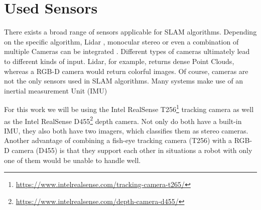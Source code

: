 \documentclass[main.tex]{subfiles}
\begin{document}
\section{Used Sensors}
There exists a broad range of sensors applicable for SLAM algorithms. Depending on the specific algorithm, Lidar \cite{8461000}, monocular \cite{Artal_Montiel_Tardos_2015} stereo \cite{Usenko_Engel_Stuckler_Cremers_2016} or even a combination of multiple Cameras can be integrated \cite{Harmat_Sharf_Trentini_2012}.
Different types of cameras ultimately lead to different kinds of input. Lidar, for example, returns dense Point Clouds, whereas a RGB-D camera would return colorful images.
Of course, cameras are not the only sensors used in SLAM algorithms. Many systems make use of an inertial measurement Unit (IMU) \cite{Leutenegger_Furgale_Rabaud_Chli_Konolige_Siegwart_2013,MurArtal_Tardos_2017}

For this work we will be using the Intel RealSense T256\footnote{\href{https://www.intelrealsense.com/tracking-camera-t265/}{https://www.intelrealsense.com/tracking-camera-t265/}} tracking camera as well as the Intel RealSense D455\footnote{\href{https://www.intelrealsense.com/depth-camera-d455/}{https://www.intelrealsense.com/depth-camera-d455/}} depth camera. Not only do both have a built-in IMU, they also both have two imagers, which classifies them as stereo cameras. Another advantage of combining a fish-eye tracking camera (T256) with a RGB-D camera (D455) is that they support each other in situations a robot with only one of them would be unable to handle well. 
\end{document}
